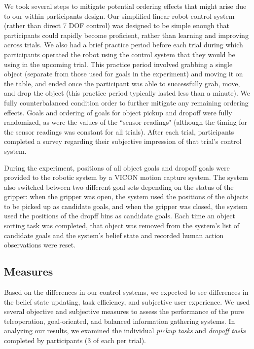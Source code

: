 \documentclass[conference]{IEEEtran}
\begin{document}
We took several steps to mitigate potential ordering effects that might arise due to our within-participants design. Our simplified linear robot control system (rather than direct 7 DOF control) was designed to be simple enough that participants could rapidly become proficient, rather than learning and improving across trials. We also had a brief practice period before each trial during which participants operated the robot using the control system that they would be using in the upcoming trial. This practice period involved grabbing a single object (separate from those used for goals in the experiment) and moving it on the table, and ended once the participant was able to successfully grab, move, and drop the object (this practice period typically lasted less than a minute). We fully counterbalanced condition order to further mitigate any remaining ordering effects. Goals and ordering of goals for object pickup and dropoff were fully randomized, as were the values of the ``sensor readings" (although the timing for the sensor readings was constant for all trials). After each trial, participants completed a survey regarding their subjective impression of that trial's control system.

During the experiment, positions of all object goals and dropoff goals were provided to the robotic system by a VICON motion capture system. The system also switched between two different goal sets depending on the status of the gripper: when the gripper was open, the system used the positions of the objects to be picked up as candidate goals, and when the gripper was closed, the system used the positions of the dropff bins as candidate goals. Each time an object sorting task was completed, that object was removed from the system's list of candidate goals and the system's belief state and recorded human action observations were reset.

\subsection{Measures}

Based on the differences in our control systems, we expected to see differences in the belief state updating, task efficiency, and subjective user experience. We used several objective and subjective measures to assess the performance of the pure teleoperation, goal-oriented, and balanced information gathering systems. In analyzing our results, we examined the individual \textit{pickup tasks} and \textit{dropoff tasks} completed by participants (3 of each per trial).
\end{document}
